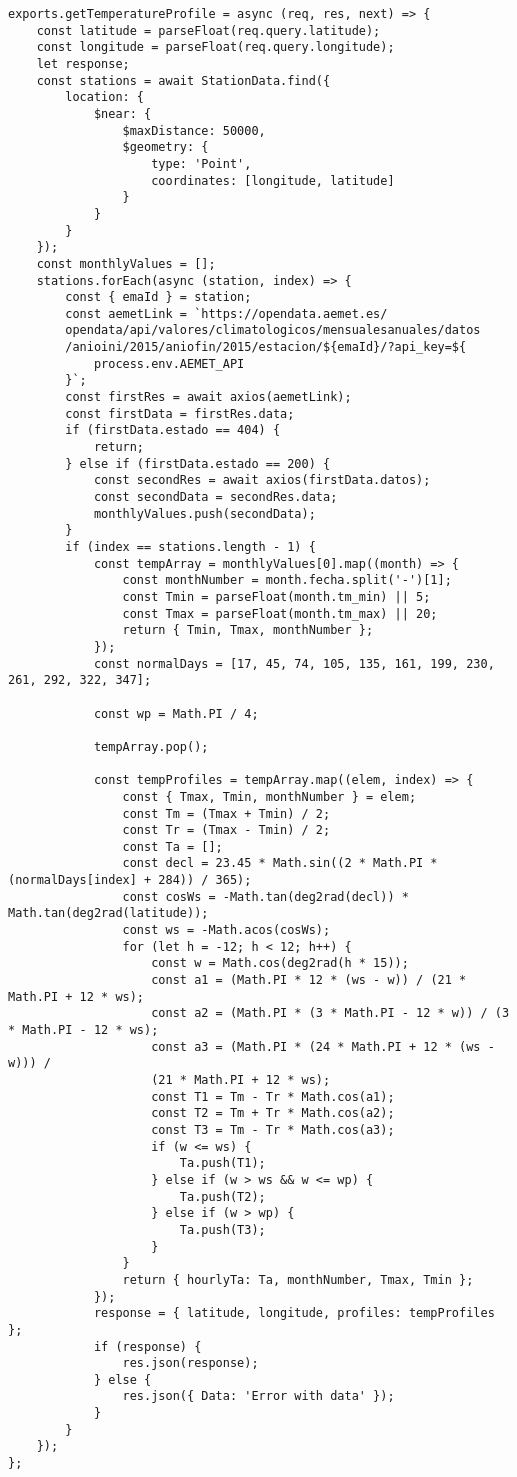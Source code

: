 \begin{lstlisting}[style=ES6, caption={Server/Controllers/dataController.js}]
exports.getTemperatureProfile = async (req, res, next) => {
	const latitude = parseFloat(req.query.latitude);
	const longitude = parseFloat(req.query.longitude);
	let response;
	const stations = await StationData.find({
		location: {
			$near: {
				$maxDistance: 50000,
				$geometry: {
					type: 'Point',
					coordinates: [longitude, latitude]
				}
			}
		}
	});
	const monthlyValues = [];
	stations.forEach(async (station, index) => {
		const { emaId } = station;
		const aemetLink = `https://opendata.aemet.es/
		opendata/api/valores/climatologicos/mensualesanuales/datos
		/anioini/2015/aniofin/2015/estacion/${emaId}/?api_key=${
			process.env.AEMET_API
		}`;
		const firstRes = await axios(aemetLink);
		const firstData = firstRes.data;
		if (firstData.estado == 404) {
			return;
		} else if (firstData.estado == 200) {
			const secondRes = await axios(firstData.datos);
			const secondData = secondRes.data;
			monthlyValues.push(secondData);
		}
		if (index == stations.length - 1) {
			const tempArray = monthlyValues[0].map((month) => {
				const monthNumber = month.fecha.split('-')[1];
				const Tmin = parseFloat(month.tm_min) || 5;
				const Tmax = parseFloat(month.tm_max) || 20;
				return { Tmin, Tmax, monthNumber };
			});
			const normalDays = [17, 45, 74, 105, 135, 161, 199, 230, 261, 292, 322, 347];

			const wp = Math.PI / 4;

			tempArray.pop();

			const tempProfiles = tempArray.map((elem, index) => {
				const { Tmax, Tmin, monthNumber } = elem;
				const Tm = (Tmax + Tmin) / 2;
				const Tr = (Tmax - Tmin) / 2;
				const Ta = [];
				const decl = 23.45 * Math.sin((2 * Math.PI * (normalDays[index] + 284)) / 365);
				const cosWs = -Math.tan(deg2rad(decl)) * Math.tan(deg2rad(latitude));
				const ws = -Math.acos(cosWs);
				for (let h = -12; h < 12; h++) {
					const w = Math.cos(deg2rad(h * 15));
					const a1 = (Math.PI * 12 * (ws - w)) / (21 * Math.PI + 12 * ws);
					const a2 = (Math.PI * (3 * Math.PI - 12 * w)) / (3 * Math.PI - 12 * ws);
					const a3 = (Math.PI * (24 * Math.PI + 12 * (ws - w))) / 
					(21 * Math.PI + 12 * ws);
					const T1 = Tm - Tr * Math.cos(a1);
					const T2 = Tm + Tr * Math.cos(a2);
					const T3 = Tm - Tr * Math.cos(a3);
					if (w <= ws) {
						Ta.push(T1);
					} else if (w > ws && w <= wp) {
						Ta.push(T2);
					} else if (w > wp) {
						Ta.push(T3);
					}
				}
				return { hourlyTa: Ta, monthNumber, Tmax, Tmin };
			});
			response = { latitude, longitude, profiles: tempProfiles };
			if (response) {
				res.json(response);
			} else {
				res.json({ Data: 'Error with data' });
			}
		}
	});
};

\end{lstlisting}

